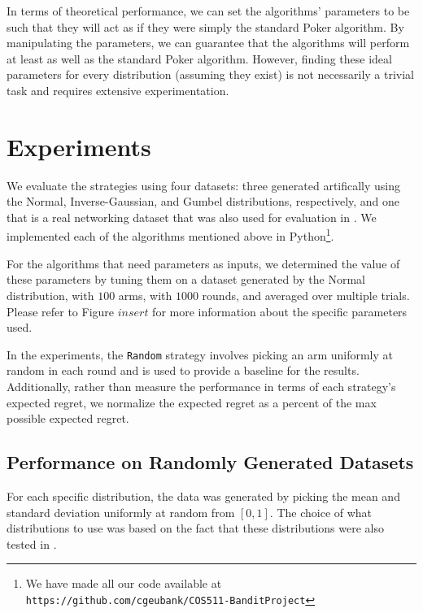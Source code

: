 \documentclass[12pt]{article}
\begin{document}
In terms of theoretical performance, we can set the algorithms' parameters to be such that they will act as if they were simply the standard Poker algorithm. By manipulating the parameters, we can guarantee that the algorithms will perform at least as well as the standard Poker algorithm. However, finding these ideal parameters for every distribution (assuming they exist) is not necessarily a trivial task and requires extensive experimentation.

\section{Experiments}

We evaluate the strategies using four datasets: three generated artifically using the Normal, Inverse-Gaussian, and Gumbel distributions, respectively,
and one that is a real networking dataset that was also used for evaluation in \cite{Mohri}. 
We implemented each of the algorithms mentioned above in Python\footnote{We have made all our code available at \texttt{https://github.com/cgeubank/COS511-BanditProject}}. 

For the algorithms that need parameters as inputs, we determined the value of these parameters by tuning them on a dataset generated by the Normal distribution, with $100$ arms,
with $1000$ rounds, and averaged over multiple trials.  Please refer to Figure $insert$ for more information about the specific parameters used.

In the experiments, the \texttt{Random} strategy involves picking an arm uniformly at random in each round and is used to provide a baseline for the results.  Additionally,
rather than measure the performance in terms of each strategy's expected regret, we normalize the expected regret as a percent of the max possible expected regret. 

\subsection{Performance on Randomly Generated Datasets}
For each specific distribution, the data was generated by picking the mean and standard deviation uniformly at random from $[0,1]$.  The choice of what
distributions to use was based on the fact that these distributions were also tested in \cite{Kuleshov}. 
\end{document}
